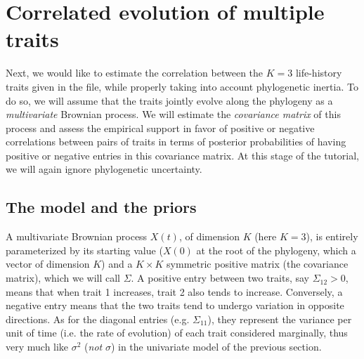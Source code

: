 \section{Correlated evolution of multiple traits}
\label{multivariate}

Next, we would like to estimate the correlation between the $K=3$ life-history traits given in the  file, while properly taking into account phylogenetic inertia. 
To do so, we will assume that the traits jointly evolve along the phylogeny as a \emph{multivariate} Brownian process.
We will estimate the \emph{covariance matrix} of this process and assess the empirical support in favor of positive or negative correlations between pairs of traits in terms of posterior probabilities of having positive or negative entries in this covariance matrix.
At this stage of the tutorial, we will again ignore phylogenetic uncertainty.

\subsection{The model and the priors}

A multivariate Brownian process $X(t)$, of dimension $K$ (here $K=3$),
is entirely parameterized by its starting value ($X(0)$ at the root of the phylogeny, which a vector of dimension $K$) and a $K \times K$ symmetric positive matrix (the covariance matrix), which we will call $\Sigma$.
A positive entry between two traits, say $\Sigma_{12} > 0$, means that when trait 1 increases, trait 2 also tends to increase. Conversely, a negative entry means that the two traits tend to undergo variation in opposite directions.
As for the diagonal entries (e.g. $\Sigma_{11}$), they represent the variance per unit of time (i.e. the rate of evolution) of each trait considered marginally,
thus very much like $\sigma^2$ (\emph{not} $\sigma$) in the univariate model of the previous section.

